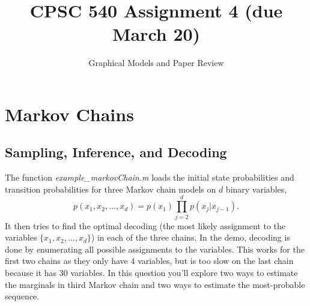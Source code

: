 \documentclass{article}
\begin{document}
\def\blu#1{{\color{blu}#1}}
\def\gre#1{{\color{gre}#1}}
\def\red#1{{\color{red}#1}}
\def\norm#1{\|#1\|}
\newcommand{\argmin}[1]{\mathop{\hbox{argmin}}_{#1}}
\newcommand{\argmax}[1]{\mathop{\hbox{argmax}}_{#1}}
\def\R{\mathbb{R}}
\newcommand{\fig}[2]{\texttt{[image: a4f/\#2]}}
\newcommand{\centerfig}[2]{\begin{center}\texttt{[image: a4f/\#2]}\end{center}}
\def\items#1{\begin{itemize}#1\end{itemize}}
\def\enum#1{\begin{enumerate}#1\end{enumerate}}
\def\argmax{\mathop{\rm arg\,max}}
\def\argmin{\mathop{\rm arg\,min}}
\def\half{\frac 1 2}
\newcommand{\code}[1]{}
\newcommand{\alignStar}[1]{\begin{align*}#1\end{align*}}
\newcommand{\mat}[1]{\begin{bmatrix}#1\end{bmatrix}}



\title{CPSC 540 Assignment 4 (due March 20)}
\author{Graphical Models and Paper Review}
\date{}
\maketitle


\section{Markov Chains}

\subsection{Sampling, Inference, and Decoding}

The function \emph{example\_markovChain.m} loads the initial state probabilities and transition probabilities for three Markov chain models on $d$ binary variables,
\[
p(x_1,x_2,\dots,x_d) = p(x_1)\prod_{j=2}^{d}{p(x_j|x_{j-1})}.
\]
It then tries to find the optimal decoding (the most likely assignment to the variables $\{x_1,x_2,\dots,x_d\}$) in each of the three chains. In the demo, decoding is done by enumerating all possible assignments to the variables. This works for the first two chains as they only have 4 variables, but is too slow on the last chain because it has 30 variables. In this question you'll explore two ways to estimate the marginals in third Markov chain and two ways to estimate the most-probable sequence.
\end{document}
